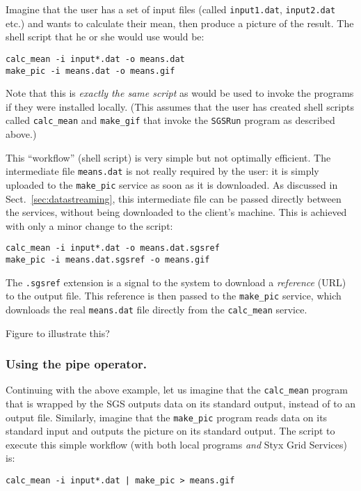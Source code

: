 \documentclass{llncs}
\begin{document}
Imagine that the user has a set of input files (called {\tt input1.dat}, {\tt input2.dat} etc.) and wants to calculate their mean, then produce a picture of the result.  The shell script that he or she would use would be:

\begin{verbatim}
calc_mean -i input*.dat -o means.dat
make_pic -i means.dat -o means.gif
\end{verbatim}

Note that this is {\em exactly the same script\/} as would be used to invoke the programs if they were installed locally.  (This assumes that the user has created shell scripts called {\tt calc\_mean} and {\tt make\_gif} that invoke the {\tt SGSRun} program as described above.)

This ``workflow'' (shell script) is very simple but not optimally efficient.  The intermediate file {\tt means.dat} is not really required by the user: it is simply uploaded to the {\tt make\_pic} service as soon as it is downloaded.  As discussed in Sect.~\ref{sec:datastreaming}, this intermediate file can be passed directly between the services, without being downloaded to the client's machine.  This is achieved with only a minor change to the script:

\begin{verbatim}
calc_mean -i input*.dat -o means.dat.sgsref
make_pic -i means.dat.sgsref -o means.gif
\end{verbatim}

The {\tt .sgsref} extension is a signal to the system to download a {\em reference\/} (URL) to the output file.  This reference is then passed to the {\tt make\_pic} service, which downloads the real {\tt means.dat} file directly from the {\tt calc\_mean} service.

Figure to illustrate this?

\subsubsection{Using the pipe operator.}\label{sec:pipes}
Continuing with the above example, let us imagine that the {\tt calc\_mean} program that is wrapped by the SGS outputs data on its standard output, instead of to an output file.  Similarly, imagine that the {\tt make\_pic} program reads data on its standard input and outputs the picture on its standard output.  The script to execute this simple workflow (with both local programs {\em and\/} Styx Grid Services) is:

\begin{verbatim}
calc_mean -i input*.dat | make_pic > means.gif
\end{verbatim}
\end{document}
